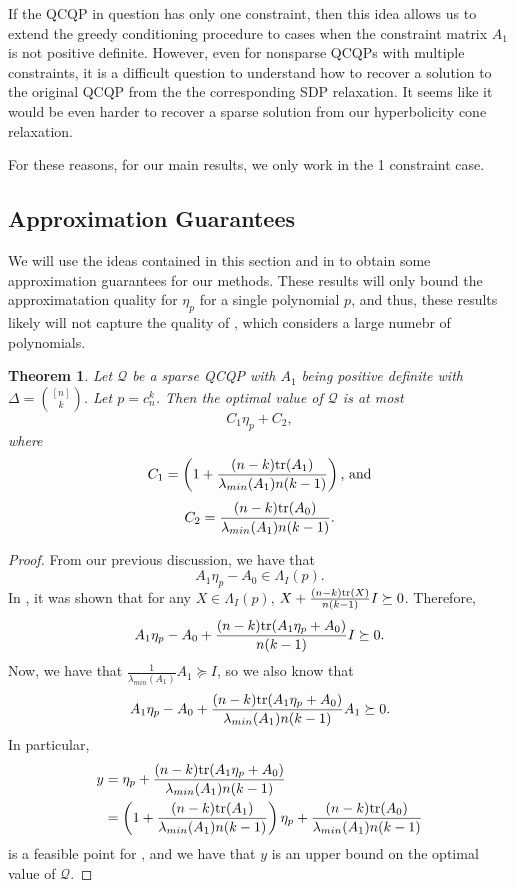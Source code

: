 \documentclass{amsart}
\newtheorem{theorem}{Theorem}[section]
\theoremstyle{definition}
\newcommand{\tr}{\textup{tr}}
\begin{document}
If the QCQP in question has only one constraint, then this idea allows us to extend the greedy conditioning procedure to cases when the constraint matrix $A_1$ is not positive definite.
However, even for nonsparse QCQPs with multiple constraints, it is a difficult question to understand how to recover a solution to the original QCQP from the the corresponding SDP relaxation.
It seems like it would be even harder to recover a sparse solution from our hyperbolicity cone relaxation.

For these reasons, for our main results, we only work in the 1 constraint case.

\subsection{Approximation Guarantees}
We will use the ideas contained in this section and in \cite{blekherman2022hyperbolic} to obtain some approximation guarantees for our methods.
These results will only bound the approximatation quality for $\eta_p$ for a single polynomial $p$, and thus, these results likely will not capture the quality of , which considers a large numebr of polynomials.
\begin{theorem}
    Let $\mathcal{Q}$ be a sparse QCQP with $A_1$ being positive definite with $\Delta = \binom{[n]}{k}$. Let $p = c_n^k$. Then the optimal value of $\mathcal{Q}$ is at most
    \[
        C_1\eta_{p} + C_2,
    \]
    where
    \[
        C_1 =\left(1+ \frac{(n-k)\tr(A_1)}{\lambda_{min}(A_1)n(k-1)}\right) \text{, and}
    \]
    \[
        C_2 = \frac{(n-k)\tr(A_0)}{\lambda_{min}(A_1)n(k-1)}.
    \]
\end{theorem}
\begin{proof}
    From our previous discussion, we have that
    \[
        A_1 \eta_p - A_0 \in \Lambda_I(p).
    \]
    In \cite{blekherman2022hyperbolic}, it was shown that for any $X \in \Lambda_I(p)$, $X + \frac{(n-k)\tr(X)}{n(k-1)}I \succeq 0$. Therefore,
    \[
        A_1 \eta_p - A_0 + \frac{(n-k)\tr(A_1 \eta_p + A_0)}{n(k-1)}I \succeq 0.
    \]
    Now, we have that $\frac{1}{\lambda_{min}(A_1)} A_1 \succeq I$, so we also know that
    \[
        A_1 \eta_p - A_0 + \frac{(n-k)\tr(A_1 \eta_p + A_0)}{\lambda_{min}(A_1)n(k-1)}A_1 \succeq 0.
    \]
    In particular,
    \begin{align*}
        y &= \eta_p  + \frac{(n-k)\tr(A_1 \eta_p + A_0)}{\lambda_{min}(A_1)n(k-1)}\\
         &=
        \left(1+ \frac{(n-k)\tr(A_1)}{\lambda_{min}(A_1)n(k-1)}\right)\eta_p  + \frac{(n-k)\tr(A_0)}{\lambda_{min}(A_1)n(k-1)}
    \end{align*}
    is a feasible point for , and we have that $y$ is an upper bound on the optimal value of $\mathcal{Q}$.
\end{proof}
\end{document}
